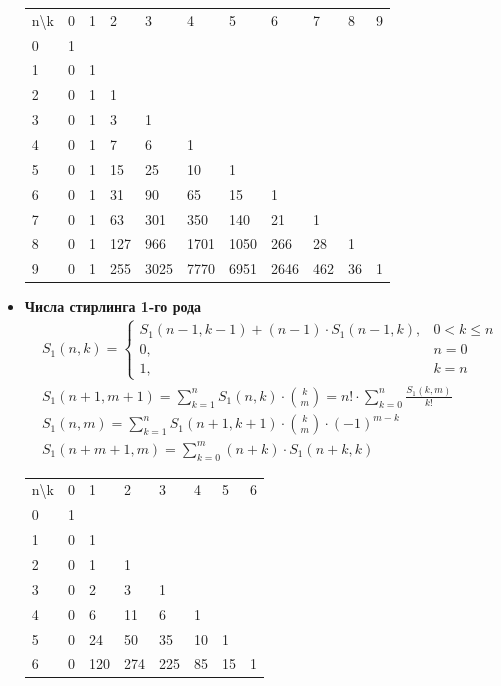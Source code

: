 \documentclass[10pt]{article}
\begin{document}
\begin{itemize}
\begin{longtable}[c]{lllllllllll}
n\textbackslash{}k & 0 & 1 & 2 & 3 & 4 & 5 & 6 & 7 & 8 & 9
\\
0 & 1 & & & & & & & & &
\\
1 & 0 & 1 & & & & & & & &
\\
2 & 0 & 1 & 1 & & & & & & &
\\
3 & 0 & 1 & 3 & 1 & & & & & &
\\
4 & 0 & 1 & 7 & 6 & 1 & & & & &
\\
5 & 0 & 1 & 15 & 25 & 10 & 1 & & & &
\\
6 & 0 & 1 & 31 & 90 & 65 & 15 & 1 & & &
\\
7 & 0 & 1 & 63 & 301 & 350 & 140 & 21 & 1 & &
\\
8 & 0 & 1 & 127 & 966 & 1701 & 1050 & 266 & 28 & 1 &
\\
9 & 0 & 1 & 255 & 3025 & 7770 & 6951 & 2646 & 462 & 36 & 1
\\

\end{longtable}
\item \textbf{Числа стирлинга 1-го рода}
\begin{equation}
  \begin{split}
    &S_1(n, k) = 
    \left\{
    \begin{array}{cc}
    S_1(n-1, k-1) + (n - 1) \cdot S_1(n-1, k), & 0 < k \le n\\
    0, & n = 0\\
    1, & k = n
    \end{array}
    \right.\\
    &S_1(n + 1, m + 1) = \sum\limits_{k = 1}^n S_1(n, k) \cdot \binom{k}{m} = n! \cdot \sum\limits_{k=0}^n\frac{S_1(k, m)}{k!}\\
    &S_1(n, m) = \sum\limits_{k=1}^n S_1(n + 1, k + 1) \cdot \binom{k}{m} \cdot (-1)^{m - k}\\
    &S_1(n + m + 1, m) = \sum\limits_{k=0}^m (n + k) \cdot S_1(n + k, k)
  \end{split}
\end{equation}
\begin{longtable}[c]{llllllll}

n\textbackslash{}k & 0 & 1 & 2 & 3 & 4 & 5 & 6
\\

0 & 1 & & & & & &
\\
1 & 0 & 1 & & & & &
\\
2 & 0 & 1 & 1 & & & &
\\
3 & 0 & 2 & 3 & 1 & & &
\\
4 & 0 & 6 & 11 & 6 & 1 & &
\\
5 & 0 & 24 & 50 & 35 & 10 & 1 &
\\
6 & 0 & 120 & 274 & 225 & 85 & 15 & 1
\\


\end{longtable}
\end{itemize}
\end{document}
